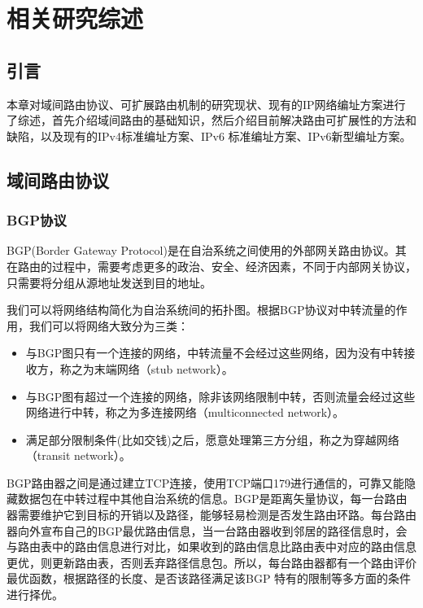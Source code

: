 

\chapter{相关研究综述}
\label{cha:review}

\section{引言}
本章对域间路由协议、可扩展路由机制的研究现状、现有的IP网络编址方案进行了综述，首先介绍域间路由的基础知识，然后介绍目前解决路由可扩展性的方法和缺陷，以及现有的IPv4标准编址方案、IPv6 标准编址方案、IPv6新型编址方案。

\section{域间路由协议}
\subsection{BGP协议}
BGP(Border Gateway Protocol)是在自治系统之间使用的外部网关路由协议。其在路由的过程中，需要考虑更多的政治、安全、经济因素，不同于内部网关协议，只需要将分组从源地址发送到目的地址。

我们可以将网络结构简化为自治系统间的拓扑图。根据BGP协议对中转流量的作用，我们可以将网络大致分为三类：

\begin{itemize}
\item 与BGP图只有一个连接的网络，中转流量不会经过这些网络，因为没有中转接收方，称之为末端网络（stub network）。
\item 与BGP图有超过一个连接的网络，除非该网络限制中转，否则流量会经过这些网络进行中转，称之为多连接网络（multiconnected network）。
\item 满足部分限制条件(比如交钱)之后，愿意处理第三方分组，称之为穿越网络（transit network）。
\end{itemize}

BGP路由器之间是通过建立TCP连接，使用TCP端口179进行通信的，可靠又能隐藏数据包在中转过程中其他自治系统的信息。BGP是距离矢量协议，每一台路由器需要维护它到目标的开销以及路径，能够轻易检测是否发生路由环路。每台路由器向外宣布自己的BGP最优路由信息，当一台路由器收到邻居的路径信息时，会与路由表中的路由信息进行对比，如果收到的路由信息比路由表中对应的路由信息更优，则更新路由表，否则丢弃路径信息包。所以，每台路由器都有一个路由评价最优函数，根据路径的长度、是否该路径满足该BGP 特有的限制等多方面的条件进行择优。

